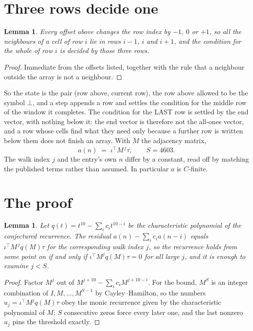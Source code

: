 \documentclass[11pt,a4paper]{article}
\theoremstyle{plain}
\newtheorem{lemma}[theorem]{Lemma}
\theoremstyle{definition}
\begin{document}
\section{Three rows decide one}

\begin{lemma}\label{lem:win}
Every offset above changes the row index by $-1$, $0$ or $+1$, so all the neighbours of a cell
of row $i$ lie in rows $i-1$, $i$ and $i+1$, and the condition for the whole of row $i$ is
decided by those three rows.
\end{lemma}

\begin{proof}
Immediate from the offsets listed, together with the rule that a neighbour outside the array is
not a neighbour.
\end{proof}

So the state is the pair (row above, current row), the row above allowed to be the symbol
$\bot$, and a step appends a row and settles the condition for the middle row of the window it
completes. The condition for the LAST row is settled by the end vector, with nothing below it:
the end vector is therefore not the all-ones vector, and a row whose cells find what they need
only because a further row is written below them does not finish an array. With $M$ the
adjacency matrix,
\[
a(n)\;=\;\iota^{\!\top}M^{\,j}\tau ,\qquad S=4603.
\]
The walk index $j$ and the entry's own $n$ differ by a constant, read off by matching the
published terms rather than assumed. In particular $a$ is $C$-finite.

\section{The proof}

\begin{lemma}\label{lem:crit}
Let $q(t)=t^{10}-\sum_i c_it^{10-i}$ be the characteristic polynomial of the
conjectured recurrence. The residual $a(n)-\sum_ic_ia(n-i)$ equals
$\iota^{\!\top}M^{\,j}q(M)\tau$ for the corresponding walk index $j$, so the recurrence
holds from some point on if and only if $\iota^{\!\top}M^{j}q(M)\tau=0$ for all large $j$,
and it is enough to examine $j<S$.
\end{lemma}

\begin{proof}
Factor $M^{j}$ out of $M^{j+10}-\sum_ic_iM^{j+10-i}$. For the bound, $M^{S}$
is an integer combination of $I,M,\dots,M^{S-1}$ by Cayley--Hamilton, so the numbers
$u_j=\iota^{\!\top}M^{j}q(M)\tau$ obey the monic recurrence given by the characteristic
polynomial of $M$; $S$ consecutive zeros force every later one, and the last nonzero $u_j$
pins the threshold exactly.
\end{proof}
\end{document}
